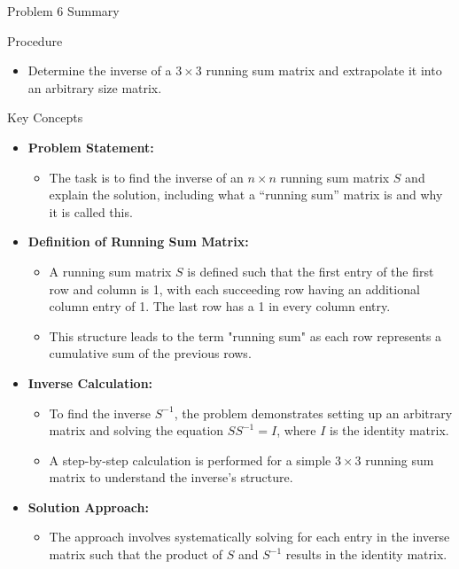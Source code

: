\begin{summary}{Problem 6 Summary}
    \begin{statement}{Procedure}
        \begin{itemize}
            \item Determine the inverse of a $3 \times 3$ running sum matrix and extrapolate it into an arbitrary size matrix.
        \end{itemize}
    \end{statement}
    \begin{statement}{Key Concepts}
        \begin{itemize}
            \item \textbf{Problem Statement:}
            \begin{itemize}
                \item The task is to find the inverse of an $n \times n$ running sum matrix $S$ and explain the solution, including what a “running sum” matrix is and why it is called this.
            \end{itemize}
            \item \textbf{Definition of Running Sum Matrix:}
            \begin{itemize}
                \item A running sum matrix $S$ is defined such that the first entry of the first row and column is 1, with each succeeding row having an additional column entry of 1. The last row 
                has a 1 in every column entry.
                \item This structure leads to the term "running sum" as each row represents a cumulative sum of the previous rows.
            \end{itemize}
            \item \textbf{Inverse Calculation:}
            \begin{itemize}
                \item To find the inverse $S^{-1}$, the problem demonstrates setting up an arbitrary matrix and solving the equation $SS^{-1} = I$, where $I$ is the identity matrix.
                \item A step-by-step calculation is performed for a simple $3 \times 3$ running sum matrix to understand the inverse's structure.
            \end{itemize}
            \item \textbf{Solution Approach:}
            \begin{itemize}
                \item The approach involves systematically solving for each entry in the inverse matrix such that the product of $S$ and $S^{-1}$ results in the identity matrix.

\end{itemize}
\end{itemize}
\end{statement}
\end{summary}

